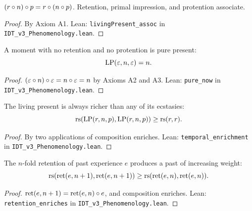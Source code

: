 \begin{theorem}
\label{thm:living-present-assoc}
$(r \circ n) \circ p = r \circ (n \circ p)$.
Retention, primal impression, and protention associate.
\end{theorem}

\begin{proof}
By Axiom A1.
Lean: \texttt{livingPresent\_assoc} in \texttt{IDT\_v3\_Phenomenology.lean}.
\end{proof}

\begin{theorem}
\label{thm:pure-now}
A moment with no retention and no protention is pure present:
\[
\mathrm{LP}(\varepsilon, n, \varepsilon) = n.
\]
\end{theorem}

\begin{proof}
$(\varepsilon \circ n) \circ \varepsilon = n \circ \varepsilon = n$ by Axioms A2 and A3.
Lean: \texttt{pure\_now} in \texttt{IDT\_v3\_Phenomenology.lean}.
\end{proof}

\begin{theorem}
\label{thm:temporal-enrichment}
The living present is always richer than any of its ecstasies:
\[
\mathrm{rs}(\mathrm{LP}(r, n, p), \mathrm{LP}(r, n, p)) \geq \mathrm{rs}(r, r).
\]
\end{theorem}

\begin{proof}
By two applications of composition enriches.
Lean: \texttt{temporal\_enrichment} in \texttt{IDT\_v3\_Phenomenology.lean}.
\end{proof}

\begin{theorem}
\label{thm:retention-enriches}
The $n$-fold retention of past experience $e$ produces a past of increasing
weight:
\[
\mathrm{rs}(\mathrm{ret}(e, n+1), \mathrm{ret}(e, n+1)) \geq
\mathrm{rs}(\mathrm{ret}(e, n), \mathrm{ret}(e, n)).
\]
\end{theorem}

\begin{proof}
$\mathrm{ret}(e, n+1) = \mathrm{ret}(e, n) \circ e$, and composition
enriches.
Lean: \texttt{retention\_enriches} in \texttt{IDT\_v3\_Phenomenology.lean}.
\end{proof}

